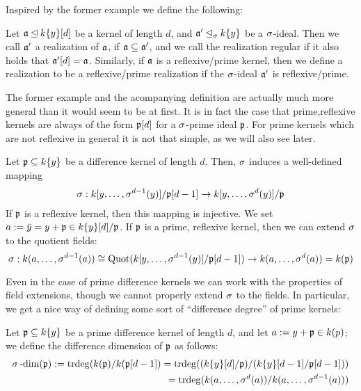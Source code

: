Inspired by the former example we define the following:
\begin{defn}
Let $\mathfrak{a} \unlhd k\{y\}[d]$ be a kernel of length $d$, and $\mathfrak{a}' \unlhd_{\sigma} k\{y\}$ be a $\sigma$-ideal. Then we call $\mathfrak{a}'$ a realization of $\mathfrak{a}$, if $\mathfrak{a} \subseteq \mathfrak{a}'$, 
and we call the realization regular if it also holds that $\mathfrak{a}'[d] = \mathfrak{a}$. Similarly, if $\mathfrak{a}$ is a reflexive/prime kernel, then we define a realization to be a reflexive/prime realization if the $\sigma$-ideal $\mathfrak{a}'$ is reflexive/prime.
\end{defn}

The former example and the acompanying definition are actually much more general than it would seem to be at first. 
It is in fact the case that prime,reflexive kernels are always of the form $\mathfrak{p}[d]$ for a $\sigma$-prime ideal $\mathfrak{p}$.
For prime kernels which are not reflexive in general it is not that simple, as we will also see later. 

\begin{rem}\label{sigmawelldeffker}
Let $\mathfrak{p} \subseteq k\{y\}$ be a difference kernel of length $d$. Then, $\sigma$ induces a well-defined mapping 
\begin{align*}
\sigma: k[y,\ldots,\sigma^{d-1}(y)]/\mathfrak{p}[d-1] \rightarrow k[y,\ldots,\sigma^{d}(y)]/\mathfrak{p}
\end{align*}
If $\mathfrak{p}$ is a reflexive kernel, then this mapping is injective. 
We set $a := \bar y = y + \mathfrak{p} \in k\{y\}[d]/\mathfrak{p}$. If $\mathfrak{p}$ is a prime, reflexive kernel, then we can extend $\sigma$ to the quotient fields:
\[ \sigma: k(a,\ldots,\sigma^{d-1}(a)) \cong \text{Quot}(k[y,\ldots,\sigma^{d-1}(y)]/\mathfrak{p}[d-1]) \rightarrow k(a,\ldots,\sigma^d(a)) = k(\mathfrak{p}) \]
\end{rem}

Even in the case of prime difference kernels we can work with the properties of field extensions, though we cannot properly extend $\sigma$ to the fields.
 In particular, we get a nice way of defining some sort of ``difference degree'' of prime kernels:
\begin{defn}
Let $\mathfrak{p} \subseteq k\{y\}$ be a prime difference kernel of length $d$, and let $a:= y + \mathfrak{p} \in k(p)$; we define the difference dimension of $\mathfrak{p}$ as follows:
\begin{align*} \sigma\operatorname{-dim}(\mathfrak{p}) := \operatorname{trdeg}(k(\mathfrak{p})/k(\mathfrak{p}[d-1]) = \operatorname{trdeg}((k\{y\}[d]/\mathfrak{p})/(k\{y\}[d-1]/\mathfrak{p}[d-1])) \\  = \operatorname{trdeg}(k(a,\ldots,\sigma^{d}(a))/k(a,\ldots,\sigma^{d-1}(a))) \end{align*}
\end{defn}

